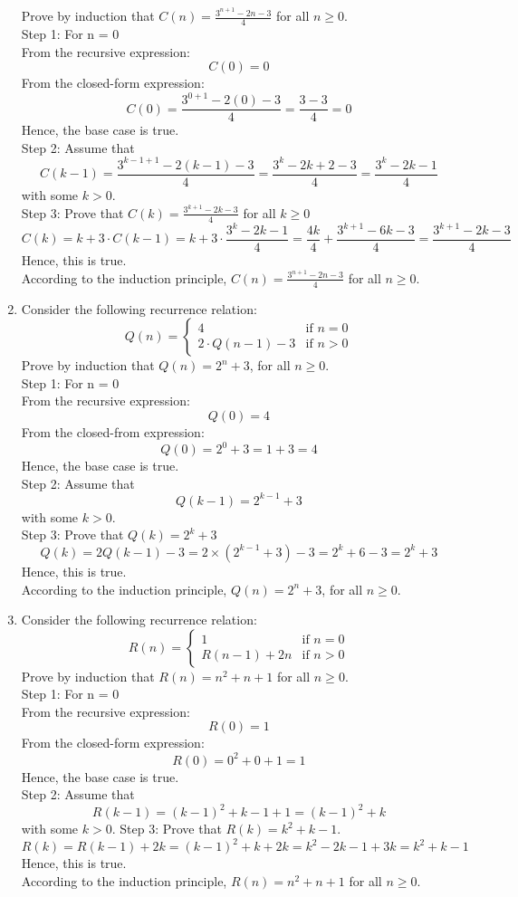 \documentclass[12pt]{article}
\begin{document}
\begin{enumerate}
    Prove by induction that $C(n) = \frac{3^{n+1} - 2n - 3}{4}$ for all $n \geq 0$.\\
    Step 1: For n = 0\\
    From the recursive expression:
    \[C(0) = 0\]
    From the closed-form expression:
    \[C(0) = \frac{3^{0+1} - 2(0) - 3}{4} = \frac{3-3}{4} = 0\]
    Hence, the base case is true.\\
    Step 2: Assume that
    \[C(k-1) = \frac{3^{k-1+1} - 2(k-1) - 3}{4} = \frac{3^{k} - 2k + 2 - 3}{4} = \frac{3^{k} - 2k - 1}{4}\] 
    with some $k > 0$.\\
    Step 3: Prove that $C(k) = \frac{3^{k+1} - 2k - 3}{4}$ for all $k \geq 0$
    \[C(k) = k + 3 \cdot C(k-1) = k + 3 \cdot \frac{3^{k} - 2k - 1}{4} = \frac{4k}{4} + \frac{3^{k+1} - 6k - 3}{4} = \frac{3^{k+1} - 2k - 3}{4}\]
    Hence, this is true.\\
    According to the induction principle, $C(n) = \frac{3^{n+1} - 2n - 3}{4}$ for all $n \geq 0$.
    \item Consider the following recurrence relation:
    \[
    Q(n) = 
    \begin{cases}
    4 & \text{if } n = 0 \\
    2 \cdot Q(n-1) - 3& \text{if } n > 0
    \end{cases}
    \]     
    Prove by induction that $Q(n) = 2^n + 3$, for all $n \geq 0$.\\
    Step 1: For n = 0\\
    From the recursive expression:
    \[Q(0) = 4\]
    From the closed-from expression:
    \[Q(0) = 2^0 + 3 = 1 + 3 = 4\]
    Hence, the base case is true.\\
    Step 2: Assume that
    \[Q(k-1) = 2^{k-1} + 3\]
    with some $k > 0$.\\
    Step 3: Prove that $Q(k) = 2^k + 3$
    \[Q(k) = 2Q(k-1) - 3 = 2 \times (2^{k-1} + 3) - 3 = 2^k + 6 - 3 = 2^k + 3\]
    Hence, this is true.\\
    According to the induction principle, $Q(n) = 2^n + 3$, for all $n \geq 0$.

    \item Consider the following recurrence relation:
    \[
    R(n) = 
    \begin{cases}
    1 & \text{if } n = 0 \\
    R(n-1) + 2n& \text{if } n > 0
    \end{cases}
    \]
    Prove by induction that $R(n) = n^2 + n + 1$ for all $n \geq 0$.\\
    Step 1: For n = 0\\
    From the recursive expression:
    \[R(0) = 1\]
    From the closed-form expression:
    \[R(0) = 0^2 + 0 + 1 = 1\]
    Hence, the base case is true.\\
    Step 2: Assume that
    \[R(k-1) = (k-1)^2 + k - 1 + 1 = (k-1)^2 + k\]
    with some $k > 0 $.
    Step 3: Prove that $R(k) = k^2 + k - 1$.
    \[R(k) = R(k-1) + 2k = (k-1)^2 + k + 2k = k^2 - 2k - 1 + 3k = k^2 + k -1\]
    Hence, this is true.\\
    According to the induction principle, $R(n) = n^2 + n + 1$ for all $n \geq 0$.


\end{enumerate}
\end{document}
